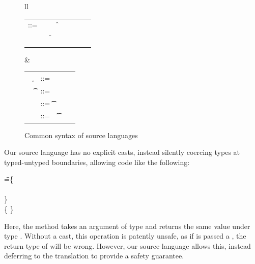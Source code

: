 \documentclass{tex/llncs}
\begin{document}
\begin{figure}[!h]\hrulefill
\vspace{2mm}  \small

\begin{tabular}{ll}
\begin{minipage}{6cm}\begin{tabular}{@{}l@{~}l@{}l@{}l@{}l@{}l@{}l@{}l}
\e\hspace{.1cm} ::= & \hspace{.2cm} \x        
    &\B \this         
   &\B \FRead\f \\    
   &
   &\B \FWrite\f\e
   &\B \Call\e\m\e \\
   & 
   &\B \that      
   &\B \New\C{\e[1]..}  
\end{tabular}\end{minipage}&
\begin{minipage}{5cm}\begin{tabular}{l@{~}l@{}l@{}l}
   ~ \k &::= \Class \C {\fd[1]..}{\md[1]..} \\
   ~ \t&::= ~ \any  \B   \C  \B \src{\CW}  \\ 
    \md &::= \Mdef\m\x\t\t\e \\
   ~\fd&::= ~ \Fdef\f\t \\ 
\end{tabular}\end{minipage} 
\end{tabular}
\vspace{2mm} 
\caption{Common syntax of source languages}\label{f:sourcesyntax}
\end{figure}

Our source language has no explicit casts, instead silently coercing
types at typed-untyped boundaries, allowing code like the following:

\begin{tabbing}
\hspace{1cm}\K\HS \Call{\New\C{}}\m{\New\D{}} \HS\HS\HS\WHERE\HS
  \K\HS =\HS \= \class\= \C \{\\
       \> \HS \Mdef\m\x\any\C{\HS\x\HS}\\
       \> \}  \\
       \>\class \D \{ \}
\end{tabbing}         

\noindent Here, the method \m takes an argument of type \any and returns the
same value under type \C. Without a cast, this operation is patently unsafe,
as if \m is passed a \D, the return type of \m will be wrong. However, our
source language allows this, instead deferring  to the translation to  provide
a safety guarantee.
\end{document}
